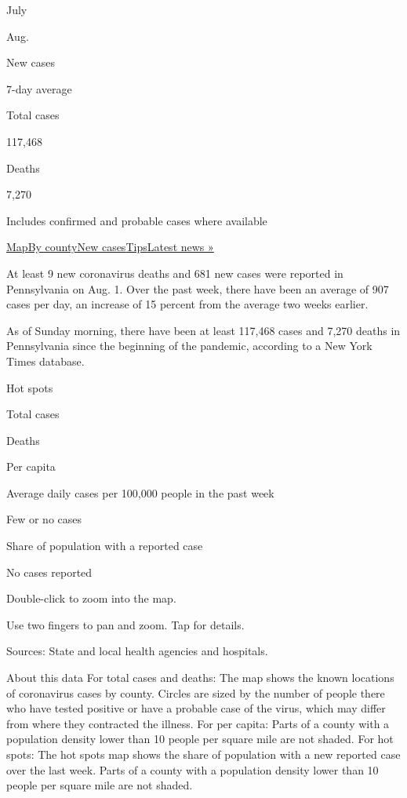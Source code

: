 July

Aug.

New cases

7-day average

Total cases

117,468

Deaths

7,270

Includes confirmed and probable cases where available

\protect\hyperlink{map}{Map}\protect\hyperlink{county}{By
county}\protect\hyperlink{cases}{New
cases}\protect\hyperlink{tips}{Tips}\href{https://www.nytimes.com/2020/08/01/world/coronavirus-covid-19.html}{Latest
news »}

At least 9 new coronavirus deaths and 681 new cases were reported in
Pennsylvania on Aug. 1. Over the past week, there have been an average
of 907 cases per day, an increase of 15 percent from the average two
weeks earlier.

As of Sunday morning, there have been at least 117,468 cases and 7,270
deaths in Pennsylvania since the beginning of the pandemic, according to
a New York Times database.

Hot spots

Total cases

Deaths

Per capita

Average daily cases per 100,000 people in the past week

Few or no cases

Share of population with a reported case

No cases reported

Double-click to zoom into the map.

Use two fingers to pan and zoom. Tap for details.

Sources: State and local health agencies and hospitals.

About this data For total cases and deaths: The map shows the known
locations of coronavirus cases by county. Circles are sized by the
number of people there who have tested positive or have a probable case
of the virus, which may differ from where they contracted the illness.
For per capita: Parts of a county with a population density lower than
10 people per square mile are not shaded. For hot spots: The hot spots
map shows the share of population with a new reported case over the last
week. Parts of a county with a population density lower than 10 people
per square mile are not shaded.

